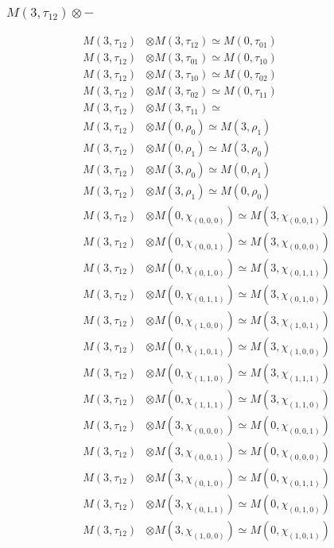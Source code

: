 \subsubsection{$ M(3,\tau_{12})\otimes -$}
\begin{align*}
M(3,\tau_{12}) &\otimes M(3,\tau_{12}) \simeq M(0,\tau_{01}) \\
M(3,\tau_{12}) &\otimes M(3,\tau_{01}) \simeq M(0,\tau_{10}) \\
M(3,\tau_{12}) &\otimes M(3,\tau_{10}) \simeq M(0,\tau_{02}) \\
M(3,\tau_{12}) &\otimes M(3,\tau_{02}) \simeq M(0,\tau_{11}) \\
M(3,\tau_{12}) &\otimes M(3,\tau_{11}) \simeq  \\
M(3,\tau_{12}) &\otimes M(0,\rho_{0}) \simeq M(3,\rho_{1}) \\
M(3,\tau_{12}) &\otimes M(0,\rho_{1}) \simeq M(3,\rho_{0}) \\
M(3,\tau_{12}) &\otimes M(3,\rho_{0}) \simeq M(0,\rho_{1}) \\
M(3,\tau_{12}) &\otimes M(3,\rho_{1}) \simeq M(0,\rho_{0}) \\
M(3,\tau_{12}) &\otimes M(0,\chi_{(0,0,0)}) \simeq M(3,\chi_{(0,0,1)}) \\
M(3,\tau_{12}) &\otimes M(0,\chi_{(0,0,1)}) \simeq M(3,\chi_{(0,0,0)}) \\
M(3,\tau_{12}) &\otimes M(0,\chi_{(0,1,0)}) \simeq M(3,\chi_{(0,1,1)}) \\
M(3,\tau_{12}) &\otimes M(0,\chi_{(0,1,1)}) \simeq M(3,\chi_{(0,1,0)}) \\
M(3,\tau_{12}) &\otimes M(0,\chi_{(1,0,0)}) \simeq M(3,\chi_{(1,0,1)}) \\
M(3,\tau_{12}) &\otimes M(0,\chi_{(1,0,1)}) \simeq M(3,\chi_{(1,0,0)}) \\
M(3,\tau_{12}) &\otimes M(0,\chi_{(1,1,0)}) \simeq M(3,\chi_{(1,1,1)}) \\
M(3,\tau_{12}) &\otimes M(0,\chi_{(1,1,1)}) \simeq M(3,\chi_{(1,1,0)}) \\
M(3,\tau_{12}) &\otimes M(3,\chi_{(0,0,0)}) \simeq M(0,\chi_{(0,0,1)}) \\
M(3,\tau_{12}) &\otimes M(3,\chi_{(0,0,1)}) \simeq M(0,\chi_{(0,0,0)}) \\
M(3,\tau_{12}) &\otimes M(3,\chi_{(0,1,0)}) \simeq M(0,\chi_{(0,1,1)}) \\
M(3,\tau_{12}) &\otimes M(3,\chi_{(0,1,1)}) \simeq M(0,\chi_{(0,1,0)}) \\
M(3,\tau_{12}) &\otimes M(3,\chi_{(1,0,0)}) \simeq M(0,\chi_{(1,0,1)}) \\

\end{align*}
